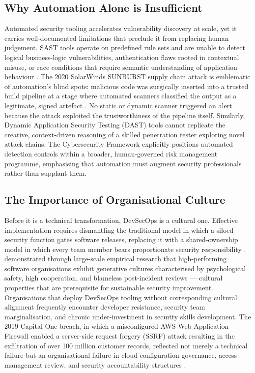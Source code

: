 \documentclass[12pt,a4paper]{article}
\begin{document}
\subsection*{Why Automation Alone is Insufficient}

Automated security tooling accelerates vulnerability discovery at scale, yet it carries
well-documented limitations that preclude it from replacing human judgement. SAST tools
operate on predefined rule sets and are unable to detect logical business-logic
vulnerabilities, authentication flaws rooted in contextual misuse, or race conditions that
require semantic understanding of application behaviour \citep{livshits2005}. The 2020
SolarWinds SUNBURST supply chain attack is emblematic of automation's blind spots:
malicious code was surgically inserted into a trusted build pipeline at a stage where
automated scanners classified the output as a legitimate, signed artefact
\citep{cisasolarwinds2021}. No static or dynamic scanner triggered an alert because the
attack exploited the trustworthiness of the pipeline itself. Similarly, Dynamic Application
Security Testing (DAST) tools cannot replicate the creative, context-driven reasoning of a
skilled penetration tester exploring novel attack chains. The \citet{nist2018} Cybersecurity
Framework explicitly positions automated detection controls within a broader,
human-governed risk management programme, emphasising that automation must augment
security professionals rather than supplant them.

\subsection*{The Importance of Organisational Culture}

Before it is a technical transformation, DevSecOps is a cultural one. Effective
implementation requires dismantling the traditional model in which a siloed security
function gates software releases, replacing it with a shared-ownership model in which every
team member bears proportionate security responsibility \citep{kim2016}.
\citet{forsgren2018} demonstrated through large-scale empirical research that
high-performing software organisations exhibit generative cultures characterised by
psychological safety, high cooperation, and blameless post-incident reviews --- cultural
properties that are prerequisite for sustainable security improvement. Organisations that
deploy DevSecOps tooling without corresponding cultural alignment frequently encounter
developer resistance, security team marginalisation, and chronic under-investment in
security skills development. The 2019 Capital One breach, in which a misconfigured AWS Web
Application Firewall enabled a server-side request forgery (SSRF) attack resulting in the
exfiltration of over 100 million customer records, reflected not merely a technical failure
but an organisational failure in cloud configuration governance, access management review,
and security accountability structures \citep{senate2019}.
\end{document}
